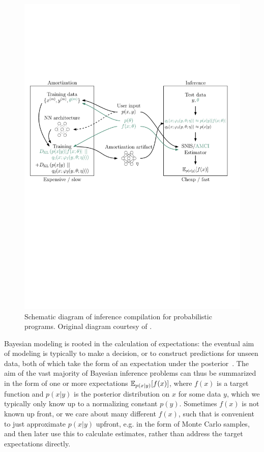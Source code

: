 \documentclass[12pt]{article}
\begin{document}
\begin{figure}[t]
  \centering
  \includegraphics[width=\linewidth]{figures/diagram.pdf}
  \caption{
  Schematic diagram of inference compilation for probabilistic programs. 
  Original diagram courtesy of \citet{LeEtAl2016}.}
  \label{fig:inf-amortization}
\end{figure}

Bayesian modeling is rooted in the calculation of expectations:
the eventual aim of modeling is typically to make a decision, or to construct
predictions for unseen data, both of which take the form of an expectation under
the posterior~\citep{robert2007bayesian}.  The aim of the vast majority
of Bayesian inference problems can thus be summarized in the form of one or more
expectations $\mathbb{E}_{p(x|y)}\! \left[f(x)\right]$, where $f(x)$ is a target function and
$p(x|y)$ is the posterior distribution on $x$ for some data $y$, 
which we typically only know up to a normalizing constant $p(y)$.  Sometimes $f(x)$
is not known up front, or we care about many different $f(x)$, such
that is convenient to just approximate $p(x|y)$ upfront, e.g. in the form of 
Monte Carlo samples, and then later use this to calculate estimates, rather than
address the target expectations directly.
\end{document}
